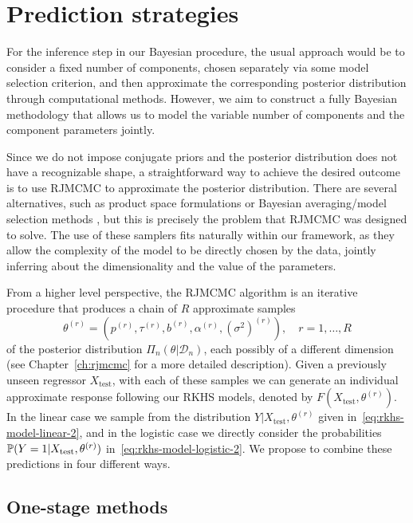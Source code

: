 \section{Prediction strategies}\label{sec:prediction-bfr}

For the inference step in our Bayesian procedure, the usual approach would be to consider a fixed number of components, chosen separately via some model selection criterion, and then approximate the corresponding posterior distribution through computational methods. However, we aim to construct a fully Bayesian methodology that allows us to model the variable number of components and the component parameters jointly. 

Since we do not impose conjugate priors and the posterior distribution does not have a recognizable shape, a straightforward way to achieve the desired outcome is to use \acs{RJMCMC} to approximate the posterior distribution. There are several alternatives, such as product space formulations \citep{carlin1995bayesian} or Bayesian averaging/model selection methods \citep{hoeting1999bayesian}, but this is precisely the problem that \acs{RJMCMC} was designed to solve. The use of these samplers fits naturally within our framework, as they allow the complexity of the model to be directly chosen by the data, jointly inferring about the dimensionality and the value of the parameters.

From a higher level perspective, the \acs{RJMCMC} algorithm is an iterative procedure that produces a chain of \(R\) approximate samples 
\[
\theta^{(r)}=\left(p^{(r)}, \tau^{(r)}, b^{(r)}, \alpha^{(r)}, (\sigma^{2})^{(r)}\right), \quad r=1,\dots,R
\] 
of the posterior distribution \(\Pi_n(\theta| \mathcal D_n)\), each possibly of a different dimension (see Chapter~\ref{ch:rjmcmc} for a more detailed description). Given a previously unseen regressor \(X_{\text{test}}\), with each of these samples we can generate an individual approximate response following our \acs{RKHS} models, denoted by \(F(X_{\text{test}}, \theta^{(r)})\). In the linear case we sample from the distribution \(Y | X_{\text{test}}, \theta^{(r)}\) given in~\eqref{eq:rkhs-model-linear-2}, and in the logistic case we directly consider the probabilities \(\mathbb{P}(Y=1|X_{\text{test}},\theta^{(r)})\) in~\eqref{eq:rkhs-model-logistic-2}. We propose to combine these predictions in four different ways.

\subsection{One-stage methods}

